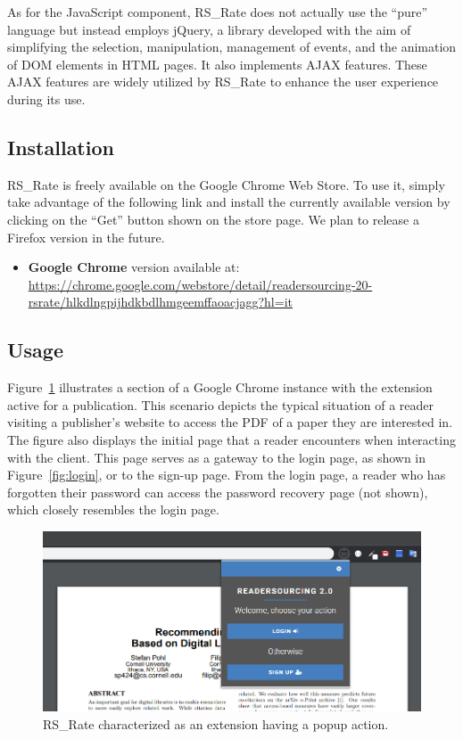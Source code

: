 \documentclass[a4paper, english]{article}
\newcommand{\rsrate}{RS\_Rate\xspace}
\begin{document}
As for the JavaScript component, \rsrate does not actually use the ``pure'' language but instead employs jQuery, a library developed with the aim of simplifying the selection, manipulation, management of events, and the animation of DOM elements in HTML pages. It also implements AJAX features. These AJAX features are widely utilized by \rsrate to enhance the user experience during its use.

\subsection{Installation}

\rsrate is freely available on the Google Chrome Web Store. To use it, simply take advantage of the following link and install the currently available version by clicking on the ``Get'' button shown on the store page. We plan to release a Firefox version in the future.
\begin{itemize}
\item \textbf{Google Chrome} version available at: \url{https://chrome.google.com/webstore/detail/readersourcing-20-rsrate/hlkdlngpijhdkbdlhmgeemffaoacjagg?hl=it}
\end{itemize}

\subsection{Usage}

Figure~\ref{fig:ux-1} illustrates a section of a Google Chrome instance with the extension active for a publication. This scenario depicts the typical situation of a reader visiting a publisher's website to access the PDF of a paper they are interested in. The figure also displays the initial page that a reader encounters when interacting with the client. This page serves as a gateway to the login page, as shown in Figure~\ref{fig:login}, or to the sign-up page. From the login page, a reader who has forgotten their password can access the password recovery page (not shown), which closely resembles the login page.

\begin{figure}
\centering
\includegraphics[width=\textwidth]{figures/ux-1.png}
\caption{\rsrate characterized as an extension having a popup action.}
\label{fig:ux-1}
\end{figure}
\end{document}
